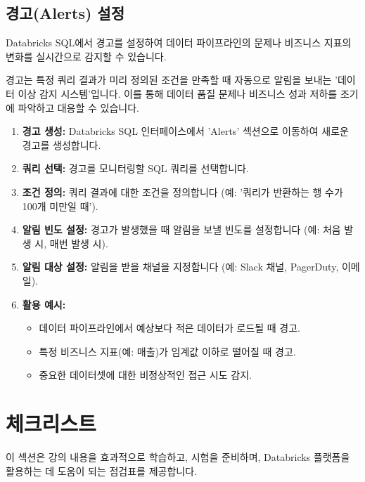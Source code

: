 \documentclass[11pt,a4paper]{article}
\begin{document}
\subsection{경고(Alerts) 설정}
Databricks SQL에서 경고를 설정하여 데이터 파이프라인의 문제나 비즈니스 지표의 변화를 실시간으로 감지할 수 있습니다.

\begin{tcolorbox}[mybox={핵심 요약: 데이터 이상 감지 시스템}]
경고는 특정 쿼리 결과가 미리 정의된 조건을 만족할 때 자동으로 알림을 보내는 '데이터 이상 감지 시스템'입니다. 이를 통해 데이터 품질 문제나 비즈니스 성과 저하를 조기에 파악하고 대응할 수 있습니다.
\end{tcolorbox}

\begin{enumerate}
    \item \textbf{경고 생성:} Databricks SQL 인터페이스에서 'Alerts' 섹션으로 이동하여 새로운 경고를 생성합니다.
    \item \textbf{쿼리 선택:} 경고를 모니터링할 SQL 쿼리를 선택합니다.
    \item \textbf{조건 정의:} 쿼리 결과에 대한 조건을 정의합니다 (예: '쿼리가 반환하는 행 수가 100개 미만일 때').
    \item \textbf{알림 빈도 설정:} 경고가 발생했을 때 알림을 보낼 빈도를 설정합니다 (예: 처음 발생 시, 매번 발생 시).
    \item \textbf{알림 대상 설정:} 알림을 받을 채널을 지정합니다 (예: Slack 채널, PagerDuty, 이메일).
    \item \textbf{활용 예시:}
    \begin{itemize}
        \item 데이터 파이프라인에서 예상보다 적은 데이터가 로드될 때 경고.
        \item 특정 비즈니스 지표(예: 매출)가 임계값 이하로 떨어질 때 경고.
        \item 중요한 데이터셋에 대한 비정상적인 접근 시도 감지.
    \end{itemize}
\end{enumerate}

\newpage
\section{체크리스트}

이 섹션은 강의 내용을 효과적으로 학습하고, 시험을 준비하며, Databricks 플랫폼을 활용하는 데 도움이 되는 점검표를 제공합니다.
\end{document}
